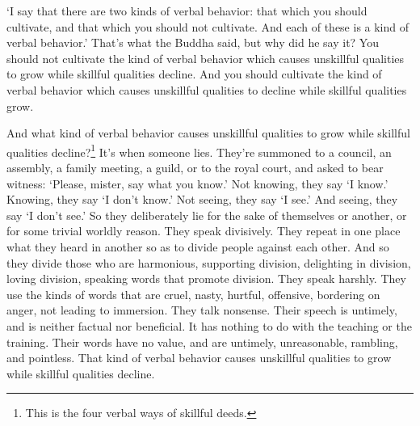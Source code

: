 \documentclass[12pt,openany]{book}%
\begin{document}
‘I say that there are two kinds of verbal behavior: that which you should cultivate, and that which you should not cultivate. And each of these is a kind of verbal behavior.’ That’s what the Buddha said, but why did he say it? You should not cultivate the kind of verbal behavior which causes unskillful qualities to grow while skillful qualities decline. And you should cultivate the kind of verbal behavior which causes unskillful qualities to decline while skillful qualities grow. 

And what kind of verbal behavior causes unskillful qualities to grow while skillful qualities decline?\footnote{This is the four verbal ways of skillful deeds. } It’s when someone lies. They’re summoned to a council, an assembly, a family meeting, a guild, or to the royal court, and asked to bear witness: ‘Please, mister, say what you know.’ Not knowing, they say ‘I know.’ Knowing, they say ‘I don’t know.’ Not seeing, they say ‘I see.’ And seeing, they say ‘I don’t see.’ So they deliberately lie for the sake of themselves or another, or for some trivial worldly reason. They speak divisively. They repeat in one place what they heard in another so as to divide people against each other. And so they divide those who are harmonious, supporting division, delighting in division, loving division, speaking words that promote division. They speak harshly. They use the kinds of words that are cruel, nasty, hurtful, offensive, bordering on anger, not leading to immersion. They talk nonsense. Their speech is untimely, and is neither factual nor beneficial. It has nothing to do with the teaching or the training. Their words have no value, and are untimely, unreasonable, rambling, and pointless. That kind of verbal behavior causes unskillful qualities to grow while skillful qualities decline. 
\end{document}

